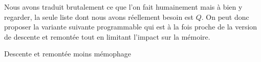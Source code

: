 Nous avons traduit brutalement ce que l'on fait humainement mais à bien y regarder, la seule liste dont nous avons réellement besoin est $Q$. 
On peut donc proposer la variante suivante programmable qui est à la fois proche de la version de descente et remontée tout en limitant l'impact sur la mémoire.


{\small
\begin{algo}[frame]
	\caption{Descente et remontée moins mémophage} \label{algo-human-paper-bis}
	\BlankLine
\end{algo}
}
